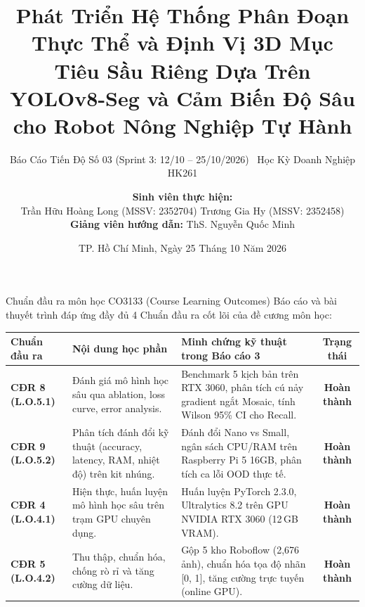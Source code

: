 \documentclass[aspectratio=169, 10pt]{beamer}
\title[CO3133 -- Báo Cáo Tiến Độ Số 3]{Phát Triển Hệ Thống Phân Đoạn Thực Thể và Định Vị 3D Mục Tiêu Sầu Riêng Dựa Trên YOLOv8-Seg và Cảm Biến Độ Sâu cho Robot Nông Nghiệp Tự Hành}
\subtitle{Báo Cáo Tiến Độ Số 03 (Sprint 3: 12/10 -- 25/10/2026) \textbar\ Học Kỳ Doanh Nghiệp HK261}
\author[Trần Hữu Hoàng Long \& Trương Gia Hy]{
    \textbf{Sinh viên thực hiện:}\\
    Trần Hữu Hoàng Long (MSSV: 2352704) \quad\textbar\quad Trương Gia Hy (MSSV: 2352458)\\[4pt]
    \textbf{Giảng viên hướng dẫn:} ThS. Nguyễn Quốc Minh
}
\institute[HCMUT -- CSE]{
    Khoa Khoa học và Kỹ thuật Máy tính -- Trường Đại học Bách khoa, ĐHQG-HCM\\[2pt]
    Môn học: \textbf{Học sâu và Ứng dụng (CO3133)} \textbar\ Đề án Doanh nghiệp gốc: \textbf{HK261-DAGD1-558}
}
\date[25/10/2026]{TP. Hồ Chí Minh, Ngày 25 Tháng 10 Năm 2026}
\begin{document}

\begin{frame}
    \titlepage
\end{frame}

\begin{frame}{Chuẩn đầu ra môn học CO3133 (Course Learning Outcomes)}
\footnotesize
Báo cáo và bài thuyết trình đáp ứng đầy đủ 4 Chuẩn đầu ra cốt lõi của đề cương môn học:
\vspace{0.15cm}
\begin{table}[htbp]
\centering
\scriptsize
\renewcommand{\arraystretch}{1.1}
\begin{tabularx}{\textwidth}{l p{4.2cm} X c}
\toprule
\textbf{Chuẩn đầu ra} & \textbf{Nội dung học phần} & \textbf{Minh chứng kỹ thuật trong Báo cáo 3} & \textbf{Trạng thái} \\
\midrule
\textbf{CĐR 8 (L.O.5.1)} & Đánh giá mô hình học sâu qua ablation, loss curve, error analysis. & Benchmark 5 kịch bản trên RTX 3060, phân tích cú nảy gradient ngắt Mosaic, tính Wilson 95\% CI cho Recall. & \textbf{Hoàn thành} \\
\textbf{CĐR 9 (L.O.5.2)} & Phân tích đánh đổi kỹ thuật (accuracy, latency, RAM, nhiệt độ) trên kit nhúng. & Đánh đổi Nano vs Small, ngân sách CPU/RAM trên Raspberry Pi 5 16GB, phân tích ca lỗi OOD thực tế. & \textbf{Hoàn thành} \\
\textbf{CĐR 4 (L.O.4.1)} & Hiện thực, huấn luyện mô hình học sâu trên trạm GPU chuyên dụng. & Huấn luyện PyTorch 2.3.0, Ultralytics 8.2 trên GPU NVIDIA RTX 3060 (12\,GB VRAM). & \textbf{Hoàn thành} \\
\textbf{CĐR 5 (L.O.4.2)} & Thu thập, chuẩn hóa, chống rò rỉ và tăng cường dữ liệu. & Gộp 5 kho Roboflow (2,676 ảnh), chuẩn hóa tọa độ nhãn [0, 1], tăng cường trực tuyến (online GPU). & \textbf{Hoàn thành} \\
\bottomrule
\end{tabularx}
\end{table}
\end{frame}
\end{document}
